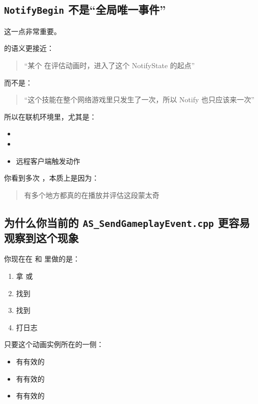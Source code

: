 \subsection{\texttt{NotifyBegin} 不是“全局唯一事件”}

这一点非常重要。

 的语义更接近：

\begin{quote}
	“某个  在评估动画时，进入了这个 NotifyState 的起点”
\end{quote}

而不是：

\begin{quote}
	“这个技能在整个网络游戏里只发生了一次，所以 Notify 也只应该来一次”
\end{quote}

所以在联机环境里，尤其是：

\begin{itemize}
	\item {}
	\item {}
	\item 远程客户端触发动作
\end{itemize}

你看到多次 ，本质上是因为：

\begin{quote}
	有多个地方都真的在播放并评估这段蒙太奇
\end{quote}

\subsection{为什么你当前的 \texttt{AS\_SendGameplayEvent.cpp} 更容易观察到这个现象}

你现在在  和  里做的是：

\begin{enumerate}
	\item 拿  或 
	\item 找到 
	\item 找到 
	\item 打日志
\end{enumerate}

只要这个动画实例所在的一侧：

\begin{itemize}
	\item 有有效的 
	\item 有有效的 
	\item 有有效的 
\end{itemize}

